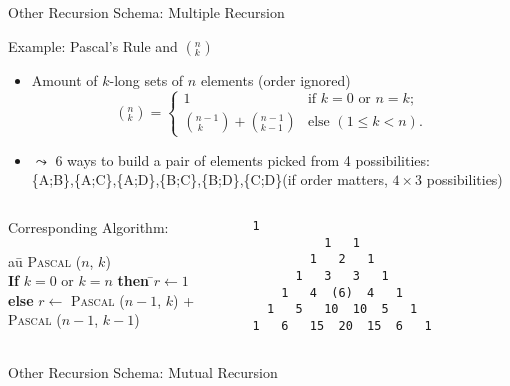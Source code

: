 \begin{Coupe}
\begin{frame}[fragile]{Other Recursion Schema: \alert{Multiple Recursion}}
\bigskip

\begin{block}{Example: Pascal's Rule and $\left(^n_k\right)$}
  \begin{itemize}
  \item Amount of $k$-long sets of $n$ elements (order ignored)
    $$ \left(^n_k\right) = \left \{
      \begin{array}{cl}
        1 & \mbox{if } k = 0 \mbox{ or } n=k;\\
        \left(^{n-1}_{~k}\right)  +  \left(_{k-1}^{n-1}\right) & \mbox{else }
        (1\leq k<n).
      \end{array}
    \right.
    $$  
  \item {} $\leadsto$ 6 ways to build a pair of
    elements picked from 4 possibilities:\\[4pt]
    \{A;B\},\{A;C\},\{A;D\},\{B;C\},\{B;D\},\{C;D\}\hfill (if order matters,
    $4\times 3$ possibilities)
  \end{itemize}
\end{block}

\begin{columns}
  \begin{column}{.65\linewidth}
    \begin{block}{Corresponding Algorithm:}
      \begin{tabbing}
        au\=\kill
        \textsc{Pascal} ($n$, $k$)\\[1mm]
        \> \textbf{If} $k=0$ or $k=n$ \=\textbf{then} \=$r\leftarrow 1$\\
        \>                            \>\textbf{else} \>$r\leftarrow$
                                        \=\textsc{Pascal} ($n-1$, $k$) +\\
        \>\>\>\>\textsc{Pascal} ($n-1$, $k-1$)
      \end{tabbing}  
    \end{block}    
  \end{column}
  \begin{column}{.33\linewidth}
    \begin{Verbatim}[label=First rows]
            1
          1   1
        1   2   1
      1   3   3   1
    1   4  (6)  4   1      
  1   5   10  10  5   1      
1   6   15  20  15  6   1      
    \end{Verbatim}
  \end{column}
\end{columns}

\end{frame}
\begin{frame}{Other Recursion Schema: \alert{Mutual Recursion}}


\end{frame}
\end{Coupe}

